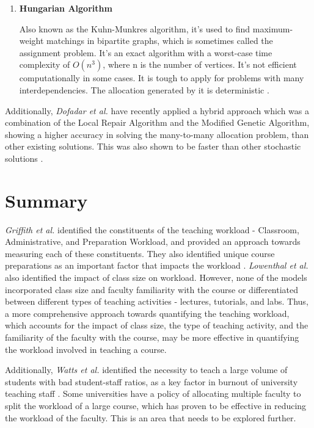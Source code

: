 \begin{enumerate}
  \item \textbf{Hungarian Algorithm}

        Also known as the Kuhn-Munkres algorithm, it's used to find maximum-weight matchings in bipartite graphs, which is sometimes called the assignment problem.
        It's an exact algorithm with a worst-case time complexity of $O(n^3)$, where n is the number of vertices. It's not efficient computationally in some cases. It is tough to apply for problems with many interdependencies. The allocation generated by it is deterministic \cite{munkres1957algorithms}.
\end{enumerate}

Additionally, \textit{Dofadar et al.} have recently applied a hybrid approach which was a combination of the Local Repair Algorithm and the Modified Genetic Algorithm, showing a higher accuracy in solving the many-to-many allocation problem, than other existing solutions. This was also shown to be faster than other stochastic solutions \cite{dofadar2021hybrid}.

\section{Summary}


\textit{Griffith et al.} identified the constituents of the teaching workload - Classroom, Administrative, and Preparation Workload, and provided an approach towards measuring each of these constituents. They also identified unique course preparations as an important factor that impacts the workload \cite{griffith2020framework}. \textit{Lowenthal et al.} also identified the impact of class size on workload. However, none of the models incorporated class size and faculty familiarity with the course or differentiated between different types of teaching activities - lectures, tutorials, and labs. Thus, a more comprehensive approach towards quantifying the teaching workload, which accounts for the impact of class size, the type of teaching activity, and the familiarity of the faculty with the course, may be more effective in quantifying the workload involved in teaching a course.


Additionally, \textit{Watts et al.} identified the necessity to teach a large volume of students with bad student-staff ratios, as a key factor in burnout of university teaching staff \cite{watts2011burnout}. Some universities have a policy of allocating multiple faculty to split the workload of a large course, which has proven to be effective in reducing the workload of the faculty. This is an area that needs to be explored further.

